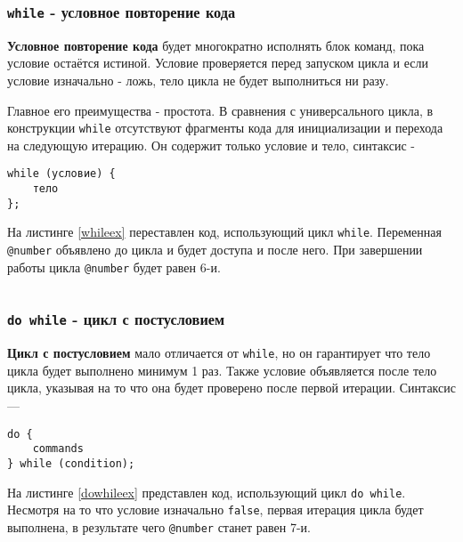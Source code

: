\begin{sourcecode}
	\label{uniloopex}
    \inputminted[linenos]{icl}{../sources/uniloopex.icL}
\end{sourcecode}

\subsubsection{\texttt{while} - условное повторение кода}

{\bf Условное повторение кода} будет многократно исполнять блок команд, пока условие остаётся истиной. Условие проверяется перед запуском цикла и если условие изначально - ложь, тело цикла не будет выполниться ни разу.

Главное его преимущества - простота. В сравнения с универсального цикла, в конструкции \texttt{while} отсутствуют фрагменты кода для инициализации и перехода на следующую итерацию. Он содержит только условие и тело, синтаксис -
\begin{verbatim}
while (условие) {
	тело
};
\end{verbatim}

На листинге \ref{whileex} переставлен код, использующий цикл \texttt{while}. Переменная \texttt{@number} объявлено до цикла и будет доступа и после него. При завершении работы цикла \texttt{@number} будет равен 6-и.

\begin{sourcecode}
	\label{whileex}
    \inputminted[linenos]{icl}{../sources/whileex.icL}
\end{sourcecode}

\subsubsection{\texttt{do while} - цикл с постусловием}

{\bf Цикл с постусловием} мало отличается от \texttt{while}, но он гарантирует что тело цикла будет выполнено минимум 1 раз. Также условие объявляется после тело цикла, указывая на то что она будет проверено после первой итерации. Синтаксис —
\begin{verbatim}
do {
	commands
} while (condition);
\end{verbatim}

На листинге \ref{dowhileex} представлен код, использующий цикл \texttt{do while}. Несмотря на то что условие изначально \texttt{false}, первая итерация цикла будет выполнена, в результате чего \texttt{@number} станет равен 7-и.

